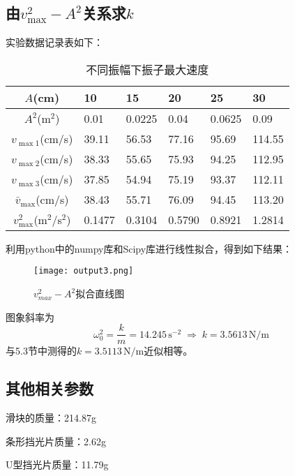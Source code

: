 \documentclass[UTF-8,twoside,cs4size]{ctexart}
\begin{document}
\subsection{由$ v_\max^2-A^2 $关系求$ k $}
实验数据记录表如下：
\begin{table}[!h]
    \centering		
    \renewcommand\arraystretch{1.5}
    \begin{tabularx}{\textwidth}{|c|Y|Y|Y|Y|Y|}
        \hline
        $ A $\;(cm)&10&15&20&25&30\\
        \hline
        $ A^2 $\;(m$ ^2 $)&0.01&0.0225&0.04&0.0625&0.09\\
        \hline
        $ v_{\max 1} $\;(cm/s)&39.11&56.53&77.16&95.69&114.55\\
        \hline
        $ v_{\max 2} $\;(cm/s)&38.33&55.65&75.93&94.25&112.95\\
        \hline
        $ v_{\max 3} $\;(cm/s)&37.85&54.94&75.19&93.37&112.11\\
        \hline
        $ \bar v_{\max} $\;(cm/s)&38.43&55.71&76.09&94.45&113.20\\
        \hline
        $ v^2_{\max} $\;(m$ ^2 $/s$ ^2 $)&0.1477&0.3104&0.5790&0.8921&1.2814\\
        \hline
    \end{tabularx}
    \caption{不同振幅下振子最大速度}
\end{table}

利用python中的numpy库和Scipy库进行线性拟合，得到如下结果：
\newpage
\begin{figure}[!h]
    \centering
    \texttt{[image: output3.png]}
    \caption{$v_{max}^2 - A^2$拟合直线图}
\end{figure}
图象斜率为\[ \omega_0^2=\frac km=14.245\,\mathrm{s^{-2}}\;\Longrightarrow\; k=3.5613\,\mathrm{N/m}\]
	与5.3节中测得的$ k=3.5113\,\mathrm{N/m} $近似相等。

\subsection{其他相关参数}
滑块的质量：214.87g

条形挡光片质量：2.62g
    
U型挡光片质量：11.79g
\end{document}
